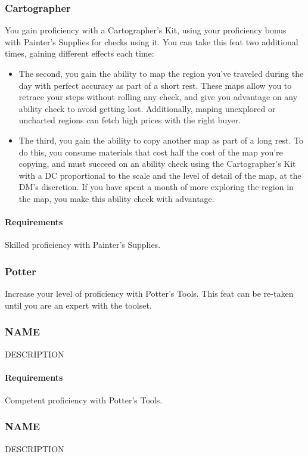 \subsubsection{Cartographer} \label{feat::cartographer}
    You gain proficiency with a Cartographer's Kit, using your proficiency bonus with Painter's Supplies for checks using it.
    You can take this feat two additional times, gaining different effects each time:
    \begin{itemize}
        \item The second, you gain the ability to map the region you've traveled during the day with perfect accuracy as part of a short rest.
        These maps allow you to retrace your steps without rolling any check, and give you advantage on any ability check to avoid getting lost.
        Additionally, maping unexplored or uncharted regions can fetch high prices with the right buyer.
        \item The third, you gain the ability to copy another map as part of a long rest.
        To do this, you consume materials that cost half the cost of the map you're copying, and must succeed on an ability check using the Cartographer's Kit with a DC proportional to the scale and the level of detail of the map, at the DM's discretion.
        If you have spent a month of more exploring the region in the map, you make this ability check with advantage.
    \end{itemize}
    \paragraph{Requirements} Skilled proficiency with Painter's Supplies.
\subsubsection{Potter} \label{feat::potter}
    Increase your level of proficiency with Potter's Tools.
    This feat can be re-taken until you are an expert with the toolset.
\subsubsection{NAME} \label{feat::name}
    DESCRIPTION
    \paragraph{Requirements} Competent proficiency with Potter's Tools.
\subsubsection{NAME} \label{feat::name}
    DESCRIPTION
